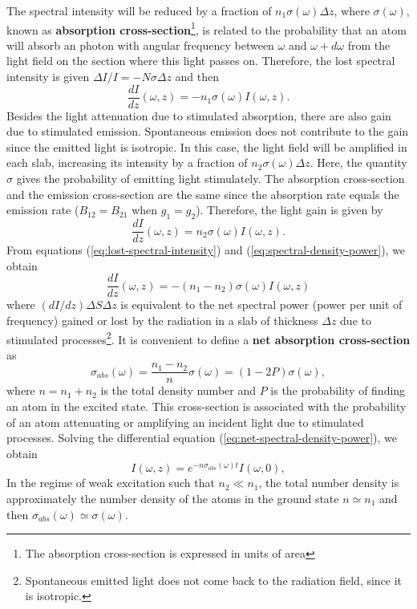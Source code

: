 The spectral intensity will be reduced by a fraction of $ n_1 \sigma(\omega) \Delta z $, where $ \sigma(\omega) $, known as \textbf{absorption cross-section}\footnote{The absorption cross-section is expressed in units of area}, is related to the probability that an atom will absorb an photon with angular frequency between $ \omega $ and $ \omega + d\omega $ from the light field on the section where this light passes on. Therefore, the lost spectral intensity is given $ \Delta I / I = - N \sigma \Delta z $ and then
\begin{equation}
	\frac{dI}{dz}(\omega, z) = - n_1 \sigma(\omega) I(\omega, z).
	\label{eq:lost-spectral-intensity}
\end{equation}
Besides the light attenuation due to stimulated absorption, there are also gain due to stimulated emission. Spontaneous emission does not contribute to the gain since the emitted light is isotropic. In this case, the light field will be amplified in each slab, increasing its intensity by a fraction of $ n_2 \sigma(\omega) \Delta z $. Here, the quantity $ \sigma $ gives the probability of emitting light stimulately. The absorption cross-section and the emission cross-section are the same since the absorption rate equals the emission rate ($ B_{12} = B_{21} $ when $ g_1 = g_2 $). Therefore, the light gain is given by
\begin{equation}
	\frac{dI}{dz}(\omega, z) = n_2 \sigma(\omega) I(\omega, z).
	\label{eq:spectral-density-power}
\end{equation}
From equations (\ref{eq:lost-spectral-intensity}) and (\ref{eq:spectral-density-power}), we obtain
\begin{equation}
	\frac{dI}{dz}(\omega, z) = - (n_1 - n_2) \sigma(\omega) I(\omega, z)
	\label{eq:net-spectral-density-power}
\end{equation}
where $ (dI / dz) \Delta S \Delta z $ is equivalent to the net spectral power (power per unit of frequency) gained or lost by the radiation in a slab of thickness $ \Delta z $ due to stimulated processes\footnote{Spontaneous emitted light does not come back to the radiation field, since it is isotropic.}. It is convenient to define a \textbf{net absorption cross-section} as 
\begin{equation}
	\sigma_{abs}(\omega) = \frac{n_1 - n_2}{n} \sigma(\omega) = (1 - 2P)\sigma(\omega),
	\label{eq:net-absorption-cross-section}
\end{equation}
where $ n = n_1 + n_2 $ is the total density number and $ P $ is the probability of finding an atom in the excited state. This cross-section is associated with the probability of an atom attenuating or amplifying an incident light due to stimulated processes. Solving the differential equation (\ref{eq:net-spectral-density-power}), we obtain
\begin{equation}
	I(\omega, z) = e^{-n\sigma_{abs}(\omega)t}I(\omega, 0),
	\label{eq:Beer-Lambert-law}
\end{equation}
In the regime of weak excitation such that $ n_2 \ll n_1 $, the total number density is approximately the number density of the atoms in the ground state $ n \simeq n_1 $ and then $ \sigma_{abs}(\omega) \simeq \sigma(\omega) $.

